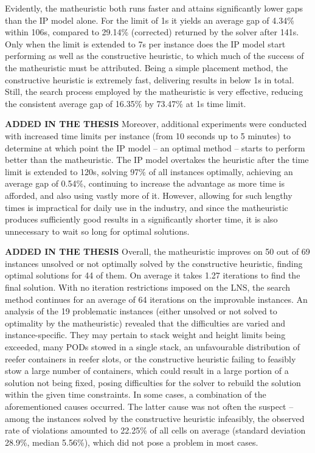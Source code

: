 \documentclass[preprint,12pt,3p]{elsarticle}
\begin{document}
Evidently, the matheuristic both runs faster and attains significantly lower gaps than the IP model alone. For the limit of 1s it yields an average gap of 4.34\% within 106s, compared to 29.14\% (corrected) returned by the solver after 141s. Only when the limit is extended to 7s per instance does the IP model start performing as well as the constructive heuristic, to which much of the success of the matheuristic must be attributed. Being a simple placement method, the constructive heuristic is extremely fast, delivering results in below 1s in total. Still, the search process employed by the matheuristic is very effective, reducing the consistent average gap of 16.35\% by 73.47\% at 1s time limit.

\textbf{ADDED IN THE THESIS} Moreover, additional experiments were conducted with increased time limits per instance (from 10 seconds up to 5 minutes) to determine at which point the IP model -- an optimal method -- starts to perform better than the matheuristic. The IP model overtakes the heuristic after the time limit is extended to 120s, solving 97\% of all instances optimally, achieving an average gap of 0.54\%, continuing to increase the advantage as more time is afforded, and also using vastly more of it. However, allowing for such lengthy times is impractical for daily use in the industry, and since the matheuristic produces sufficiently good results in a significantly shorter time, it is also unnecessary to wait so long for optimal solutions.

\textbf{ADDED IN THE THESIS} Overall, the matheuristic improves on 50 out of 69 instances unsolved or not optimally solved by the constructive heuristic, finding optimal solutions for 44 of them. On average it takes 1.27 iterations to find the final solution. With no iteration restrictions imposed on the LNS, the search method continues for an average of 64 iterations on the improvable instances. An analysis of the 19 problematic instances (either unsolved or not solved to optimality by the matheuristic) revealed that the difficulties are varied and instance-specific. They may pertain to stack weight and height limits being exceeded, many PODs stowed in a single stack, an unfavourable distribution of reefer containers in reefer slots, or the constructive heuristic failing to feasibly stow a large number of containers, which could result in a large portion of a solution not being fixed, posing difficulties for the solver to rebuild the solution within the given time constraints. In some cases, a combination of the aforementioned causes occurred. The latter cause was not often the suspect -- among the instances solved by the constructive heuristic infeasibly, the observed rate of violations amounted to 22.25\% of all cells on average (standard deviation 28.9\%, median 5.56\%), which did not pose a problem in most cases.
\end{document}
